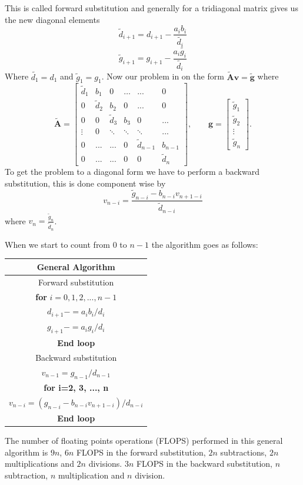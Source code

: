 \documentclass[10pt]{article}
\begin{document}
This is called forward substitution and generally for a tridiagonal matrix gives us the new diagonal elements 
$$\tilde{d}_{i+1}=d_{i+1}-\frac{a_ib_i}{\tilde{d_i}}$$  $$\tilde{g}_{i+1}=g_{i+1}-\frac{a_i\tilde{g_i}}{\tilde{d_i}}$$ Where $\tilde{d_1}=d_1$ and $\tilde{g}_1=g_1$. Now our problem in on the form $\mathbf{\tilde{A}}\mathbf{v}=\mathbf{\tilde{g}}$ where $$
\mathbf{\tilde{A}}=  \begin{bmatrix}
 \tilde{d}_1 & b_1 & 0 & \dots & ... & 0 \\
 0 &\tilde{d}_2 & b_2 & 0 & ... & 0 \\
 0  & 0 & \tilde{d}_3 & b_3 & 0 & ... \\
 \vdots & 0 & \ddots & \ddots & \ddots & ...\\
 0 & ... & ... & 0 & \tilde{d}_{n-1} & b_{n-1}\\
 0 & ... & ... & 0 & 0 & \tilde{d}_{n} 
\end{bmatrix}, \qquad \mathbf{g}=\begin{bmatrix}
 \tilde{g}_1 \\ \tilde{g}_2 \\ \vdots \\ \tilde{g}_n
\end{bmatrix}.
$$
To get the problem to a diagonal form we have to perform a backward substitution, this is done component wise by 
$$v_{n-i}=\frac{\tilde{g}_{n-i}-b_{n-i}v_{n+1-i}}{\tilde{d}_{n-i}}$$ where $v_{n}=\frac{\tilde{g}_n}{\tilde{d}_n}$. 

When we start to count from 0 to $n-1$ the algorithm goes as follows:

\begin{center}
  \begin{tabular}{||c||}
    \hline\hline
    \textbf{General Algorithm}\\
    \hline\hline
    Forward substitution \\
    \textbf{for} $i=0,1,2,...,n-1$\\
      $d_{i+1}-=a_ib_i/d_i$ \\
      $g_{i+1}-=a_ig_i/d_i$ \\
      \textbf{End loop} \\
      Backward substitution \\
      $v_{n-1}=g_{n-1}/d_{n-1}$\\
      \textbf{for i=2, 3, ..., n} \\
      $v_{n-i}=(g_{n-i}-b_{n-i}v_{n+1-i})/d_{n-i}$\\ 
      \textbf{End loop}\\
      \hline\hline
  \end{tabular}
\end{center}
The number of floating points operations (FLOPS) performed in this general algorithm is $9n$, $6n$ FLOPS in the forward substitution, $2n$ subtractions, $2n$ multiplications and $2n$ divisions. $3n$ FLOPS in the backward substitution, $n$ subtraction, $n$ multiplication and $n$ division.
\end{document}
